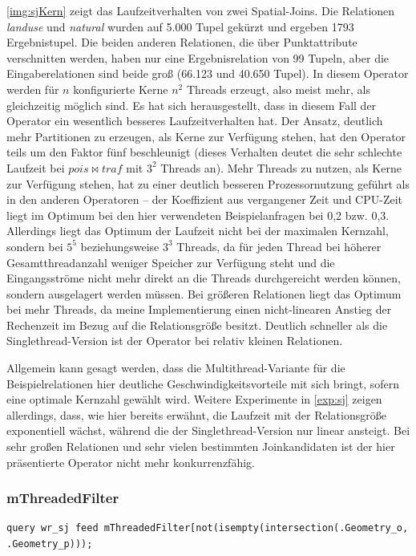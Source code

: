 \documentclass[a4paper,12pt,twoside]{article}
\newcommand{\Fb}[1]{\textit{#1}} %
\begin{document}
\autoref{img:sjKern} zeigt das Laufzeitverhalten von zwei Spatial-Joins. Die Relationen \Fb{landuse} und \Fb{natural} wurden auf 5.000 Tupel gekürzt und ergeben 1793 Ergebnistupel. Die beiden anderen Relationen, die über Punktattribute verschnitten werden, haben nur eine Ergebnisrelation von 99 Tupeln, aber die Eingaberelationen sind beide groß (66.123 und 40.650 Tupel). In diesem Operator werden für $n$ konfigurierte Kerne $n^2$ Threads erzeugt, also meist mehr, als gleichzeitig möglich sind. Es hat sich herausgestellt, dass in diesem Fall der Operator ein wesentlich besseres Laufzeitverhalten hat. Der Ansatz, deutlich mehr Partitionen zu erzeugen, als Kerne zur Verfügung stehen, hat den Operator teils um den Faktor fünf beschleunigt (dieses Verhalten deutet die sehr schlechte Laufzeit bei $pois \bowtie traf$ mit $3^2$ Threads an). Mehr Threads zu nutzen, als Kerne zur Verfügung stehen, hat zu einer deutlich besseren Prozessornutzung geführt als in den anderen Operatoren -- der Koeffizient aus vergangener Zeit und CPU-Zeit liegt im Optimum bei den hier verwendeten Beispielanfragen bei 0,2 bzw. 0,3. Allerdings liegt das Optimum der Laufzeit nicht bei der maximalen Kernzahl, sondern bei $5^5$ beziehungsweise $3^3$ Threads, da für jeden Thread bei höherer Gesamtthreadanzahl weniger Speicher zur Verfügung steht und die Eingangsströme nicht mehr direkt an die Threads durchgereicht werden können, sondern ausgelagert werden müssen. Bei größeren Relationen liegt das Optimum bei mehr Threads, da meine Implementierung einen nicht-linearen Anstieg der Rechenzeit im Bezug auf die Relationsgröße besitzt. Deutlich schneller als die Singlethread-Version ist der Operator bei relativ kleinen Relationen.

Allgemein kann gesagt werden, dass die Multithread-Variante für die Beispielrelationen hier deutliche Geschwindigkeitsvorteile mit sich bringt, sofern eine optimale Kernzahl gewählt wird. Weitere Experimente in \autoref{exp:sj} zeigen allerdings, dass, wie hier bereits erwähnt, die Laufzeit mit der Relationsgröße exponentiell wächst, während die der Singlethread-Version nur linear ansteigt. Bei sehr großen Relationen und sehr vielen bestimmten Joinkandidaten ist der hier präsentierte Operator nicht mehr konkurrenzfähig.    


\subsubsection{mThreadedFilter}
\label{funk:filter}

\begin{minipage}{0.95\textwidth}
	\begin{lstlisting}[caption={Testquery für den Filter-Operator, die auf Schnittpunkte zwischen Straßen und Wasserwegen prüft.}, label=list:testfilter]
	query wr_sj feed mThreadedFilter[not(isempty(intersection(.Geometry_o, .Geometry_p)));
	\end{lstlisting}
\end{minipage}
\end{document}
